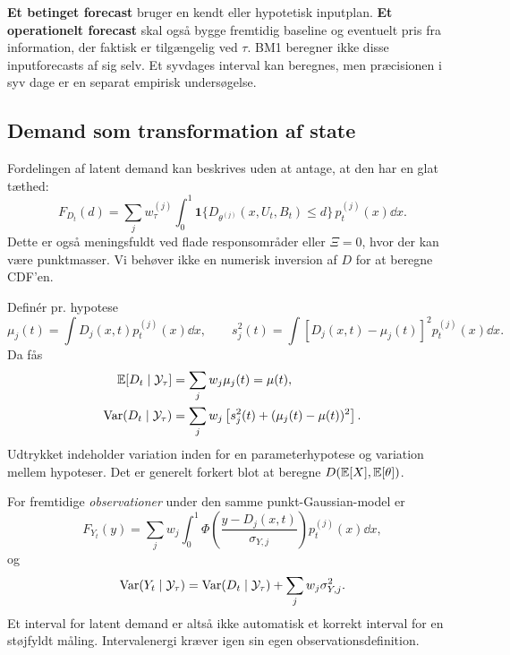 \textbf{Et betinget forecast} bruger en kendt eller hypotetisk inputplan. \textbf{Et operationelt forecast} skal også bygge fremtidig baseline og eventuelt pris fra information, der faktisk er tilgængelig ved \(\tau\). BM1 beregner ikke disse inputforecasts af sig selv. Et syvdages interval kan beregnes, men præcisionen i syv dage er en separat empirisk undersøgelse.

\subsection{Demand som transformation af state}
Fordelingen af latent demand kan beskrives uden at antage, at den har en glat tæthed:
\begin{equation}
 F_{D_t}(d)=\sum_jw_\tau^{(j)}\int_0^1
 \bm1\{D_{\theta^{(j)}}(x,U_t,B_t)\leq d\}\,p_t^{(j)}(x)\dd x.
 \label{eq:demandcdf}
\end{equation}
Dette er også meningsfuldt ved flade responsområder eller \(\Xi=0\), hvor der kan være punktmasser. Vi behøver ikke en numerisk inversion af \(D\) for at beregne CDF'en.

Definér pr. hypotese
\[
 \mu_j(t)=\int D_j(x,t)p_t^{(j)}(x)\dd x,\qquad
 s_j^2(t)=\int [D_j(x,t)-\mu_j(t)]^2p_t^{(j)}(x)\dd x.
\]
Da fås
\begin{align}
 \mathbb E[D_t\mid\mathcal Y_\tau]&=\sum_jw_j\mu_j(t)=\mu(t),\label{eq:forecastmean}\\
 \operatorname{Var}(D_t\mid\mathcal Y_\tau)&=\sum_jw_j\left[s_j^2(t)+(\mu_j(t)-\mu(t))^2\right].
 \label{eq:forecastvariance}
\end{align}
Udtrykket indeholder variation inden for en parameterhypotese og variation mellem hypoteser. Det er generelt forkert blot at beregne \(D(\mathbb E[X],\mathbb E[\theta])\).

For fremtidige \emph{observationer} under den samme punkt-Gaussian-model er
\begin{equation}
 F_{Y_t}(y)=\sum_jw_j\int_0^1
 \Phi\!\left(\frac{y-D_j(x,t)}{\sigma_{Y,j}}\right)p_t^{(j)}(x)\dd x,
 \label{eq:observationcdf}
\end{equation}
og
\begin{equation}
 \operatorname{Var}(Y_t\mid\mathcal Y_\tau)=\operatorname{Var}(D_t\mid\mathcal Y_\tau)+\sum_jw_j\sigma_{Y,j}^2.
 \label{eq:observedvariance}
\end{equation}
Et interval for latent demand er altså ikke automatisk et korrekt interval for en støjfyldt måling. Intervalenergi kræver igen sin egen observationsdefinition.

